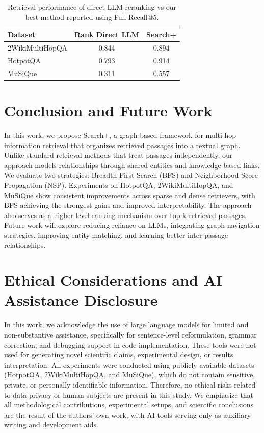 \documentclass[11pt]{article}
\begin{document}
\begin{table}[t]
\centering
\small
\begin{tabular}{lcc}
\toprule
\textbf{Dataset} & \textbf{Rank Direct LLM} & \textbf{Search+}\\
\midrule

2WikiMultiHopQA & 0.844 & 0.894\\
HotpotQA & 0.793 & 0.914 \\
MuSiQue & 0.311 & 0.557\\

\bottomrule
\end{tabular}
\caption{
Retrieval performance of direct LLM reranking vs our best method  reported using Full Recall@5.
}
\label{tab:llm_reranking}
\end{table}




\section{Conclusion and Future Work}\label{Conc}
In this work, we propose Search+, a graph-based framework for multi-hop information retrieval that organizes retrieved passages into a textual graph. Unlike standard retrieval methods that treat passages independently, our approach models relationships through shared entities and knowledge-based links.
We evaluate two strategies: Breadth-First Search (BFS) and Neighborhood Score Propagation (NSP). Experiments on HotpotQA, 2WikiMultiHopQA, and MuSiQue show consistent improvements across sparse and dense retrievers, with BFS achieving the strongest gains and improved interpretability.
The approach also serves as a higher-level ranking mechanism over top-k retrieved passages. Future work will explore reducing reliance on LLMs, integrating graph navigation strategies, improving entity matching, and learning better inter-passage relationships.




\section{Ethical Considerations and AI Assistance Disclosure}
In this work, we acknowledge the use of large language models for limited and non-substantive assistance, specifically for sentence-level reformulation, grammar correction, and debugging support in code implementation. These tools were not used for generating novel scientific claims, experimental design, or results interpretation.
All experiments were conducted using publicly available datasets (HotpotQA, 2WikiMultiHopQA, and MuSiQue), which do not contain sensitive, private, or personally identifiable information. Therefore, no ethical risks related to data privacy or human subjects are present in this study.
We emphasize that all methodological contributions, experimental setups, and scientific conclusions are the result of the authors' own work, with AI tools serving only as auxiliary writing and development aids.
\end{document}
